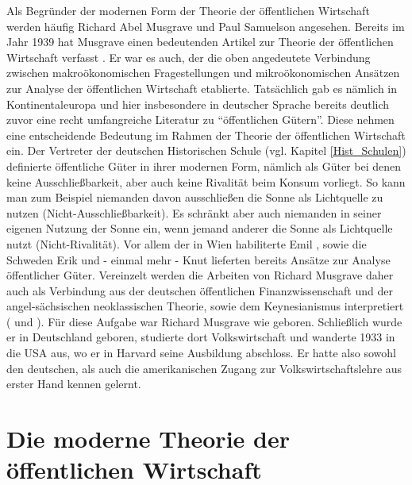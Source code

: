 Als Begründer der modernen Form der Theorie der öffentlichen Wirtschaft werden häufig Richard Abel Musgrave und Paul Samuelson angesehen. Bereits im Jahr 1939 hat Musgrave einen bedeutenden Artikel zur Theorie der öffentlichen Wirtschaft verfasst \parencite{Musgrave1939}. Er war es auch, der die oben angedeutete Verbindung zwischen makroökonomischen Fragestellungen und mikroökonomischen Ansätzen zur Analyse der öffentlichen Wirtschaft etablierte. Tatsächlich gab es nämlich in Kontinentaleuropa und hier insbesondere in deutscher Sprache bereits deutlich zuvor eine recht umfangreiche Literatur zu "`öffentlichen Gütern"'. Diese nehmen eine entscheidende Bedeutung im Rahmen der Theorie der öffentlichen Wirtschaft ein. Der Vertreter der deutschen Historischen Schule (vgl. Kapitel \ref{Hist_Schulen}) \textcite{Wagner1892} definierte öffentliche Güter in ihrer modernen Form, nämlich als Güter bei denen keine Ausschließbarkeit, aber auch keine Rivalität beim Konsum vorliegt. So kann man zum Beispiel niemanden davon ausschließen die Sonne als Lichtquelle zu nutzen (Nicht-Ausschließbarkeit). Es schränkt aber auch niemanden in seiner eigenen Nutzung der Sonne ein, wenn jemand anderer die Sonne als Lichtquelle nutzt (Nicht-Rivalität). Vor allem der in Wien habiliterte Emil \textcite{Sax1887}, sowie die Schweden Erik \textcite{Lindhal1928} und - einmal mehr - Knut \textcite{Wicksell1896} lieferten bereits Ansätze zur Analyse öffentlicher Güter. Vereinzelt werden die Arbeiten von Richard Musgrave daher auch als Verbindung aus der deutschen öffentlichen Finanzwissenschaft und der angel-sächsischen neoklassischen Theorie, sowie dem Keynesianismus interpretiert (\textcite[S. 13]{Sinn2007} und \textcite[S. 589]{Sturn2007}). Für diese Aufgabe war Richard Musgrave wie geboren. Schließlich wurde er in Deutschland geboren, studierte dort Volkswirtschaft und wanderte 1933 in die USA aus, wo er in Harvard seine Ausbildung abschloss. Er hatte also sowohl den deutschen, als auch die amerikanischen Zugang zur Volkswirtschaftslehre aus erster Hand kennen gelernt.

\section{Die moderne Theorie der öffentlichen Wirtschaft}
\label{Beginn_Public_Economy}

